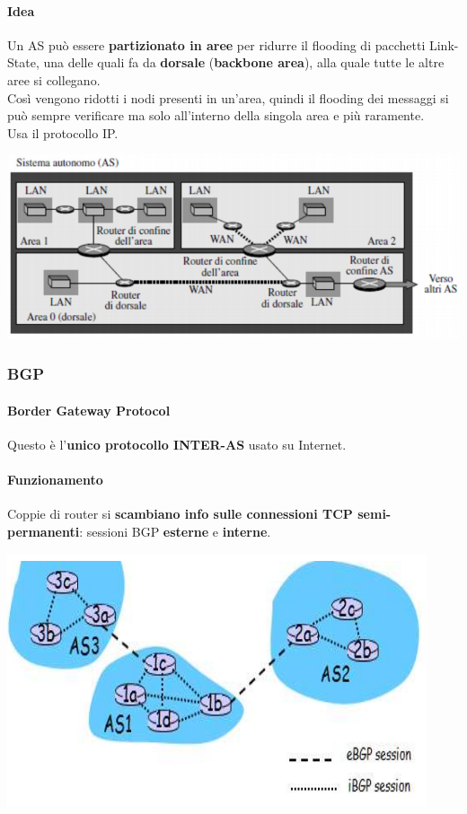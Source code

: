\documentclass[10pt]{article}
\begin{document}
\paragraph{Idea} Un AS può essere \textbf{partizionato in aree} per ridurre il flooding di pacchetti Link-State, una delle quali fa da \textbf{dorsale} (\textbf{backbone area}), alla quale tutte le altre aree si collegano.\\
Così vengono ridotti i nodi presenti in un'area, quindi il flooding dei messaggi si può sempre verificare ma solo all'interno della singola area e più raramente.\\
Usa il protocollo IP.
\begin{center}
\includegraphics[scale=0.7]{ospfaree.png}
\end{center}
\pagebreak
\subsubsection{BGP}
\paragraph{Border Gateway Protocol} Questo è l'\textbf{unico protocollo INTER-AS} usato su Internet.
\paragraph{Funzionamento} Coppie di router si \textbf{scambiano info sulle connessioni TCP semi-permanenti}: sessioni BGP \textbf{esterne} e \textbf{interne}.
\begin{center}
\includegraphics[scale=1]{bgp.png}
\end{center}
\end{document}
